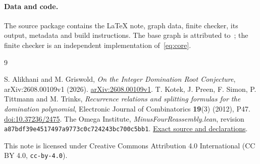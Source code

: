 \documentclass[11pt]{article}
\begin{document}
\paragraph{Data and code.}
The source package contains the LaTeX note, graph data, finite checker,
its output, metadata and build instructions.
The base graph is attributed to~\cite{AG}; the
finite checker is an independent implementation of~\eqref{eq:core}.

\begin{thebibliography}{9}
\raggedright
{} S. Alikhani and M. Griswold,
\emph{On the Integer Domination Root Conjecture},
arXiv:2608.00109v1 (2026).
\href{https://arxiv.org/abs/2608.00109v1}{arXiv:2608.00109v1}.
 T. Kotek, J. Preen, F. Simon, P. Tittmann and M. Trinks,
\emph{Recurrence relations and splitting formulas for the domination polynomial},
Electronic Journal of Combinatorics \textbf{19}(3) (2012), P47.
\href{https://doi.org/10.37236/2475}{doi:10.37236/2475}.
 The Omega Institute,
\emph{MinusFourReassembly.lean}, revision
\texttt{a87bdf39e4517497a9773c0c724243bc700c5bb1}.
\href{https://github.com/the-omega-institute/trureturing/blob/a87bdf39e4517497a9773c0c724243bc700c5bb1/D5/S3/Combinatorics/Graph/Domination/MinusFourReassembly.lean}{Exact source and declarations}.
\end{thebibliography}
\noindent\small This note is licensed under Creative Commons Attribution 4.0
International (CC BY 4.0, \texttt{cc-by-4.0}).
\end{document}
